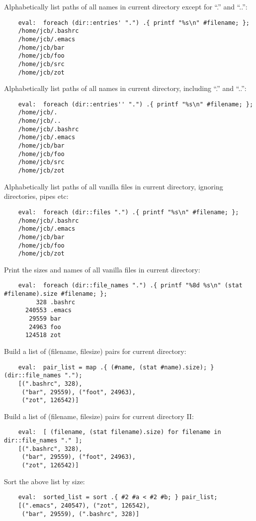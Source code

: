 Alphabetically list paths of all names in current directory except for ``.'' and ``..'':
\begin{verbatim}
    eval:  foreach (dir::entries' ".") .{ printf "%s\n" #filename; };
    /home/jcb/.bashrc
    /home/jcb/.emacs
    /home/jcb/bar
    /home/jcb/foo
    /home/jcb/src
    /home/jcb/zot
\end{verbatim}

Alphabetically list paths of all names in current directory, including ``.'' and ``..'':
\begin{verbatim}
    eval:  foreach (dir::entries'' ".") .{ printf "%s\n" #filename; };
    /home/jcb/.
    /home/jcb/..
    /home/jcb/.bashrc
    /home/jcb/.emacs
    /home/jcb/bar
    /home/jcb/foo
    /home/jcb/src
    /home/jcb/zot
\end{verbatim}

Alphabetically list paths of all vanilla files in current directory, 
ignoring directories, pipes etc:
\begin{verbatim}
    eval:  foreach (dir::files ".") .{ printf "%s\n" #filename; };
    /home/jcb/.bashrc
    /home/jcb/.emacs
    /home/jcb/bar
    /home/jcb/foo
    /home/jcb/zot
\end{verbatim}

Print the sizes and names of all vanilla files in current directory:
\begin{verbatim}
    eval:  foreach (dir::file_names ".") .{ printf "%8d %s\n" (stat #filename).size #filename; };
         328 .bashrc
      240553 .emacs
       29559 bar
       24963 foo
      124518 zot
\end{verbatim}

Build a list of (filename, filesize) pairs for current directory:
\begin{verbatim}
    eval:  pair_list = map .{ (#name, (stat #name).size); } (dir::file_names ".");
    [(".bashrc", 328), 
     ("bar", 29559), ("foot", 24963), 
     ("zot", 126542)]
\end{verbatim}

Build a list of (filename, filesize) pairs for current directory II:
\begin{verbatim}
    eval:  [ (filename, (stat filename).size) for filename in dir::file_names "." ];
    [(".bashrc", 328), 
     ("bar", 29559), ("foot", 24963), 
     ("zot", 126542)]
\end{verbatim}

Sort the above list by size:
\begin{verbatim}
    eval:  sorted_list = sort .{ #2 #a < #2 #b; } pair_list;
    [(".emacs", 240547), ("zot", 126542),
     ("bar", 29559), (".bashrc", 328)]
\end{verbatim}

